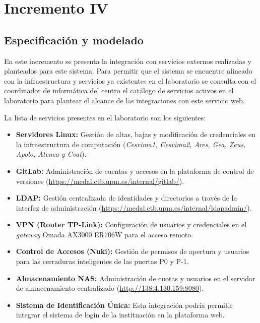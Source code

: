 \chapter{Incremento IV}
\section{Especificación y modelado}


En este incremento se presenta la integración con servicios externos realizadas y planteados para este sistema. Para permitir que el sistema se encuentre alineado con la infraestructura y servicios ya existentes en el laboratorio se consulta con el coordinador de informática del centro el catálogo de servicios activos en el laboratorio para plantear el alcance de las integraciones con este servicio web. 

La lista de servicios presentes en el laboratorio son los siguientes: 

\begin{itemize}
    \item \textbf{Servidores Linux:} Gestión de altas, bajas y modificación de credenciales en la infraestructura de computación (\textit{Cesvima1, Cesvima2, Ares, Gea, Zeus, Apolo, Atenea y Cvat}).
    \item \textbf{GitLab:} Administración de cuentas y accesos en la plataforma de control de versiones (\url{https://medal.ctb.upm.es/internal/gitlab/}).
    \item \textbf{LDAP:} Gestión centralizada de identidades y directorios a través de la interfaz de administración (\url{https://medal.ctb.upm.es/internal/ldapadmin/}).
    \item \textbf{VPN (Router TP-Link):} Configuración de usuarios y credenciales en el \textit{gateway} Omada AX3000 ER706W para el acceso remoto.
    \item \textbf{Control de Accesos (Nuki):} Gestión de permisos de apertura y usuarios para las cerraduras inteligentes de las puertas P0 y P-1.
    \item \textbf{Almacenamiento NAS:} Administración de cuotas y usuarios en el servidor de almacenamiento centralizado (\url{http://138.4.130.159:8080}).
    \item \textbf{Sistema de Identificación Única:} Esta integración podría permitir integrar el sistema de login de la instituación en la plataforma web.
\end{itemize}

